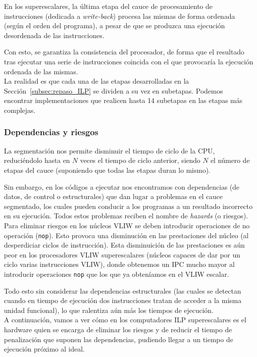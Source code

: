 En los superescalares, la última etapa del cauce de procesamiento de instrucciones (dedicada a \emph{write-back}) procesa las mismas de forma ordenada (según el orden del programa), a pesar de que se produzca una ejecución desordenada de las instrucciones.

Con esto, se garantiza la consistencia del procesador, de forma que el resultado tras ejecutar una serie de instrucciones coincida con el que provocaría la ejecución ordenada de las mismas.\\

La realidad es que cada una de las etapas desarrolladas en la Sección~\ref{subsec:repaso_ILP} se dividen a su vez en subetapas. Podemos encontrar implementaciones que realicen hasta 14 subetapas en las etapas más complejas.

\subsubsection{Dependencias y riesgos}
La segmentación nos permite disminuir el tiempo de ciclo de la CPU, reduciéndolo hasta en $N$ veces el tiempo de ciclo anterior, siendo $N$ el número de etapas del cauce (suponiendo que todas las etapas duran lo mismo).

Sin embargo, en los códigos a ejecutar nos encontramos con dependencias (de datos, de control o estructurales) que dan lugar a problemas en el cauce segmentado, los cuales pueden conducir a los programas a un resultado incorrecto en su ejecución. Todos estos problemas reciben el nombre de \emph{hazards} (o riesgos).\\

Para eliminar riesgos en los núcleos VLIW se deben introducir operaciones de no operación (\verb|nop|). Esto provoca una disminución en las prestaciones del núcleo (al desperdiciar ciclos de instrucción). Esta disminuición de las prestaciones es aún peor en los procesadores VLIW superescalares (núcleos capaces de dar por un ciclo varias instrucciones VLIW), donde obtenemos un IPC mucho mayor al introducir operaciones \verb|nop| que los que ya obteníamos en el VLIW escalar.

Todo esto sin considerar las dependencias estructurales (las cuales se detectan cuando en tiempo de ejecución dos instrucciones tratan de acceder a la misma unidad funcional), lo que ralentiza aún más los tiempos de ejecución.\\

A continuación, vamos a ver cómo en los computadores ILP superescalares es el hardware quien se encarga de eliminar los riesgos y de reducir el tiempo de penalización que suponen las dependencias, pudiendo llegar a un tiempo de ejecución próximo al ideal.

